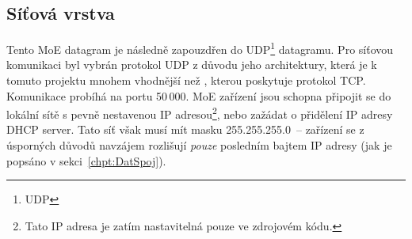 \subsection{Síťová vrstva}\label{chpt:NetworkLayer}
Tento \acs{MoE} datagram je následně zapouzdřen do \acs{UDP}\footnote{\acl{UDP}} datagramu. Pro síťovou komunikaci byl vybrán protokol \acs{UDP} z důvodu jeho  architektury, která je k tomuto projektu mnohem vhodnější než , kterou poskytuje protokol TCP. Komunikace probíhá na portu 50\,000.
\acs{MoE} zařízení jsou schopna připojit se do lokální sítě s pevně nestavenou IP adresou\footnote{Tato IP adresa je zatím nastavitelná pouze ve zdrojovém kódu.}, nebo zažádat o přidělení IP adresy DHCP server. Tato síť však musí mít masku 255.255.255.0~-- zařízení se z úsporných důvodů navzájem rozlišují \emph{pouze} posledním bajtem IP adresy (jak je popsáno v sekci~\ref{chpt:DatSpoj}).




